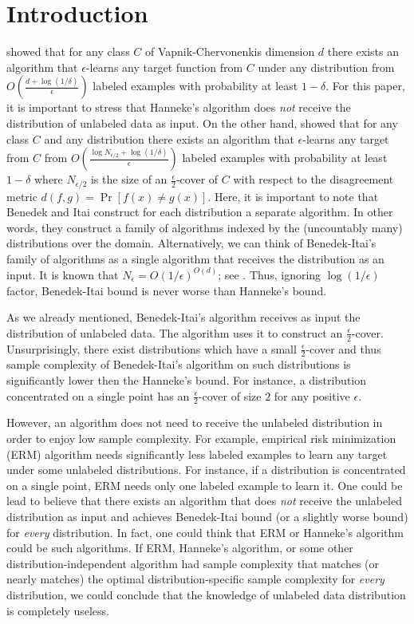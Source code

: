 \section{Introduction}
\label{section:introduction}

\citet{Hanneke-2016} showed that for any class $C$ of Vapnik-Chervonenkis
dimension $d$ there exists an algorithm that $\epsilon$-learns any target
function from $C$ under any distribution from $O\left(\frac{d +
\log(1/\delta)}{\epsilon}\right)$ labeled examples with probability at least
$1-\delta$. For this paper, it is important to stress that Hanneke's algorithm
does \emph{not} receive the distribution of unlabeled data as input. On the
other hand, \citet{Benedek-Itai-1991} showed that for any class $C$ and any
distribution there exists an algorithm that $\epsilon$-learns any target from
$C$ from $O \left( \frac{\log N_{\epsilon/2} + \log
(1/\delta)}{\epsilon}\right)$ labeled examples with probability at least
$1-\delta$ where $N_{\epsilon/2}$ is the size of an $\frac{\epsilon}{2}$-cover
of $C$ with respect to the disagreement metric $d(f,g) = \Pr[f(x) \neq g(x)]$.
Here, it is important to note that Benedek and Itai construct for each
distribution a separate algorithm. In other words, they construct a family of
algorithms indexed by the (uncountably many) distributions over the domain.
Alternatively, we can think of Benedek-Itai's family of algorithms as a single
algorithm that receives the distribution as an input. It is known that
$N_\epsilon = O(1/\epsilon)^{O(d)}$; see \citet{Dudley-1978}. Thus, ignoring
$\log(1/\epsilon)$ factor, Benedek-Itai bound is never worse than Hanneke's
bound.

As we already mentioned, Benedek-Itai's algorithm receives as input the
distribution of unlabeled data. The algorithm uses it to construct an
$\frac{\epsilon}{2}$-cover. Unsurprisingly, there exist distributions which have
a small $\frac{\epsilon}{2}$-cover and thus sample complexity of Benedek-Itai's
algorithm on such distributions is significantly lower then the Hanneke's bound.
For instance, a distribution concentrated on a single point has an
$\frac{\epsilon}{2}$-cover of size $2$ for any positive $\epsilon$.

However, an algorithm does not need to receive the unlabeled distribution in
order to enjoy low sample complexity. For example, empirical risk minimization
(ERM) algorithm needs significantly less labeled examples to learn any target
under some unlabeled distributions. For instance, if a distribution is
concentrated on a single point, ERM needs only one labeled example to learn it.
One could be lead to believe that there exists an algorithm that does \emph{not}
receive the unlabeled distribution as input and achieves Benedek-Itai bound (or
a slightly worse bound) for \emph{every} distribution. In fact, one could think
that ERM or Hanneke's algorithm could be such algorithms. If ERM, Hanneke's
algorithm, or some other distribution-independent algorithm had sample
complexity that matches (or nearly matches) the optimal distribution-specific
sample complexity for \emph{every} distribution, we could conclude that the
knowledge of unlabeled data distribution is completely useless.

